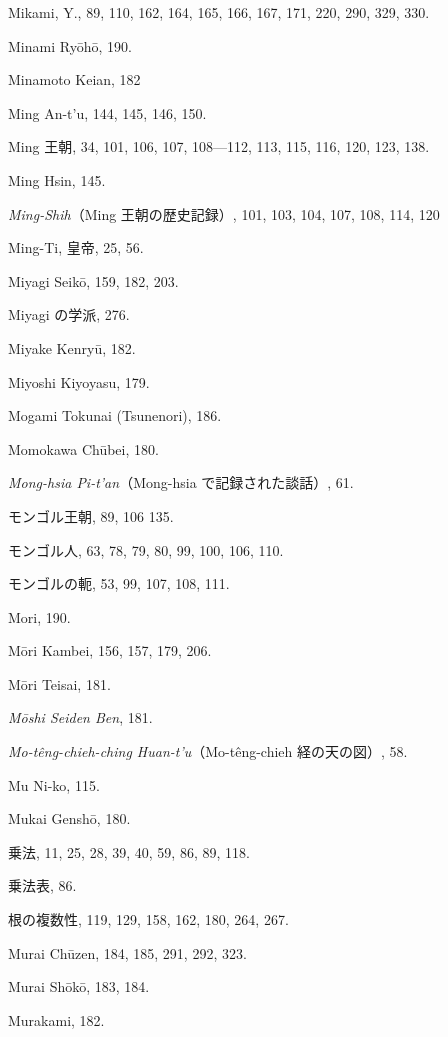 \documentclass[11pt]{article}
\begin{document}
Mikami, Y., 89, 110, 162, 164, 165, 166, 167, 171, 220, 290, 329, 330.\par
Minami Ryōhō, 190.\par
Minamoto Keian, 182\par
Ming An-t'u, 144, 145, 146, 150.\par
Ming 王朝, 34, 101, 106, 107, 108—112, 113, 115, 116, 120, 123, 138.\par
Ming Hsin, 145.\par
\emph{Ming-Shih}（Ming 王朝の歴史記録）, 101, 103, 104, 107, 108, 114, 120\par
Ming-Ti, 皇帝, 25, 56.\par
Miyagi Seikō, 159, 182, 203.\par
Miyagi の学派, 276.\par
Miyake Kenryū, 182.\par
Miyoshi Kiyoyasu, 179.\par
Mogami Tokunai (Tsunenori), 186.\par
Momokawa Chūbei, 180.\par
\emph{Mong-hsia Pi-t'an}（Mong-hsia で記録された談話）, 61.\par
モンゴル王朝, 89, 106 135.\par
モンゴル人, 63, 78, 79, 80, 99, 100, 106, 110.\par
モンゴルの軛, 53, 99, 107, 108, 111.\par
Mori, 190.\par
Mōri Kambei, 156, 157, 179, 206.\par
Mōri Teisai, 181.\par
\emph{Mōshi Seiden Ben}, 181.\par
\emph{Mo-têng-chieh-ching Huan-t'u}（Mo-têng-chieh 経の天の図）, 58.\par
Mu Ni-ko, 115.\par
Mukai Genshō, 180.\par
乗法, 11, 25, 28, 39, 40, 59, 86, 89, 118.\par
乗法表, 86.\par
根の複数性, 119, 129, 158, 162, 180, 264, 267.\par
Murai Chūzen, 184, 185, 291, 292, 323.\par
Murai Shōkō, 183, 184.\par
Murakami, 182.\par
\end{document}
